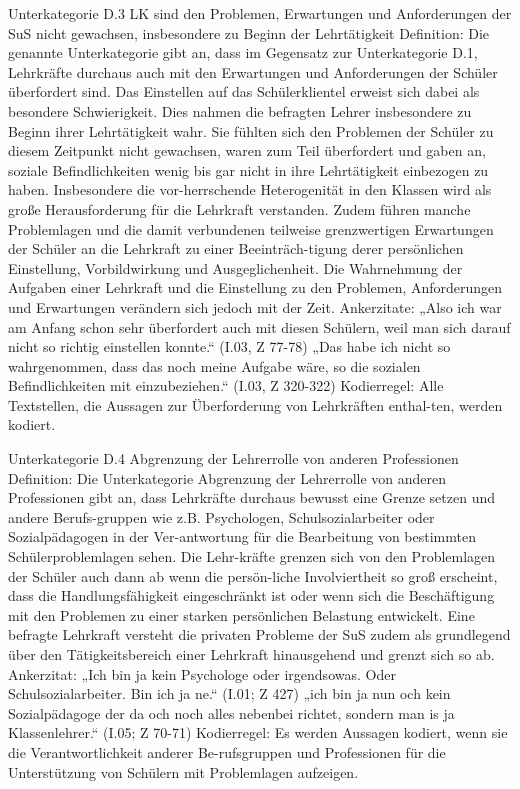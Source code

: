 Unterkategorie D.3 LK sind den Problemen, Erwartungen und Anforderungen der SuS nicht gewachsen, insbesondere zu Beginn der Lehrtätigkeit
Definition: Die genannte Unterkategorie gibt an, dass im Gegensatz zur Unterkategorie D.1, Lehrkräfte durchaus auch mit den Erwartungen und Anforderungen der Schüler überfordert sind. Das Einstellen auf das Schülerklientel erweist sich dabei als besondere Schwierigkeit. Dies nahmen die befragten Lehrer insbesondere zu Beginn ihrer Lehrtätigkeit wahr. Sie fühlten sich den Problemen der Schüler zu diesem Zeitpunkt nicht gewachsen, waren zum Teil überfordert und gaben an, soziale Befindlichkeiten wenig bis gar nicht in ihre Lehrtätigkeit einbezogen zu haben. Insbesondere die vor-herrschende Heterogenität in den Klassen wird als große Herausforderung für die Lehrkraft verstanden. Zudem führen manche Problemlagen und die damit verbundenen teilweise grenzwertigen Erwartungen der Schüler an die Lehrkraft zu einer Beeinträch-tigung derer persönlichen Einstellung, Vorbildwirkung und Ausgeglichenheit. Die Wahrnehmung der Aufgaben einer Lehrkraft und die Einstellung zu den Problemen, Anforderungen und Erwartungen verändern sich jedoch mit der Zeit. 
Ankerzitate: „Also ich war am Anfang schon sehr überfordert auch mit diesen Schülern, weil man sich darauf nicht so richtig einstellen konnte.“ (I.03, Z 77-78)  
„Das habe ich nicht so wahrgenommen, dass das noch meine Aufgabe wäre, so die sozialen Befindlichkeiten mit einzubeziehen.“ (I.03, Z 320-322)
Kodierregel: Alle Textstellen, die Aussagen zur Überforderung von Lehrkräften enthal-ten, werden kodiert. 

Unterkategorie D.4 Abgrenzung der Lehrerrolle von anderen Professionen 
Definition: Die Unterkategorie Abgrenzung der Lehrerrolle von anderen Professionen gibt an, dass Lehrkräfte durchaus bewusst eine Grenze setzen und andere Berufs-gruppen wie z.B. Psychologen, Schulsozialarbeiter oder Sozialpädagogen in der Ver-antwortung für die Bearbeitung von bestimmten Schülerproblemlagen sehen. Die Lehr-kräfte grenzen sich von den Problemlagen der Schüler auch dann ab wenn die persön-liche Involviertheit so groß erscheint, dass die Handlungsfähigkeit eingeschränkt ist oder wenn sich die Beschäftigung mit den Problemen zu einer starken persönlichen Belastung entwickelt. Eine befragte Lehrkraft versteht die  privaten Probleme der SuS zudem als grundlegend über den Tätigkeitsbereich einer Lehrkraft hinausgehend und grenzt sich so ab.
Ankerzitat:  „Ich bin ja kein Psychologe oder irgendsowas. Oder Schulsozialarbeiter. Bin ich ja ne.“ (I.01; Z 427)
„ich bin ja nun och kein Sozialpädagoge der da och noch alles nebenbei richtet, sondern man is ja Klassenlehrer.“ (I.05; Z 70-71)
Kodierregel: Es werden Aussagen kodiert, wenn sie die Verantwortlichkeit anderer Be-rufsgruppen und Professionen für die Unterstützung von Schülern mit Problemlagen aufzeigen.

